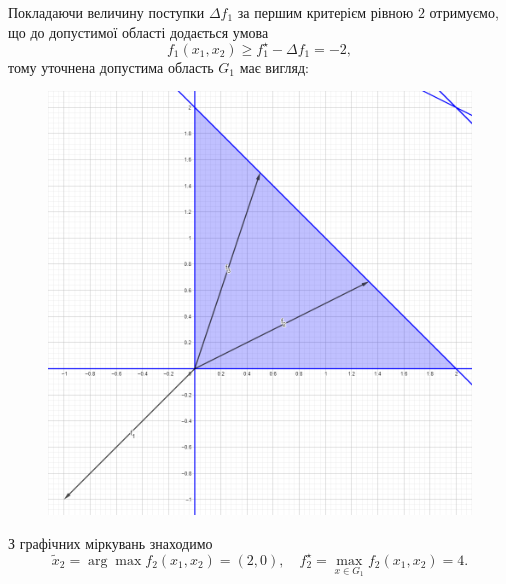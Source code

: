 \begin{solution}
    Покладаючи величину поступки $\Delta f_1$ за першим критерієм рівною $2$ отримуємо, що до допустимої області додається умова \[ f_1(x_1, x_2) \ge f_1^\star - \Delta f_1 = -2, \] тому уточнена допустима область $G_1$ має вигляд:
    \begin{figure}[H]
        \centering
        \includegraphics[width=\textwidth]{img/successive_concessions_1_2.png}
    \end{figure}

    З графічних міркувань знаходимо \[ \tilde x_2 = \arg \max f_2(x_1, x_2) = (2, 0), \quad f_2^\star = \max_{x \in G_1} f_2(x_1, x_2) = 4. \]
    

\end{solution}
